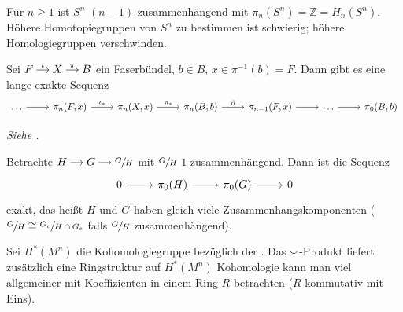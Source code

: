 \begin{bemerkung*}[{name=[Homologie und Homotopiegruppen der Sphäre]}]
	Für $n \ge 1$ ist $S^n$ $(n-1)$-zusammenhängend mit $\pi_n(S^n) = \mathbb{Z} = H_n(S^n)$.
	Höhere Homotopiegruppen von $S^n$ zu bestimmen ist schwierig; höhere Homologiegruppen verschwinden.
\end{bemerkung*}

\begin{satz}[{name={Homotopiesequenz}}]
	Sei \(
		\begin{tikzcd}[cramped,sep=small]
			F \rar["\iota"] & X \rar["\pi"] & B
		\end{tikzcd}
	\)
	ein Faserbündel, $b \in B$, $x \in \pi^{-1}(b)=F$.
	Dann gibt es eine lange exakte Sequenz
	\[
		\begin{tikzcd}
			\ldots  \rar & \pi_n(F,x) \rar["\iota_*"] & \pi_n(X,x) \rar["\pi_*"] & \pi_n(B,b) \rar["\partial"] & \pi_{n-1}(F,x) \rar & \ldots \rar & \pi_0(B,b)
		\end{tikzcd}
	\]
\end{satz}
\begin{beweis}
	\emph{Siehe \textcite[Thm.~4.41]{Hatcher}.}
\end{beweis}

\begin{beispiel*}[{name=[Zusammenhangskomponenten wenn Quotient einfach zusammenhängend]}]
	Betrachte \(
		\begin{tikzcd}[cramped,sep=small]
			H \rar & G \rar & \sfrac{G}{H}
		\end{tikzcd}
	\) mit $\sfrac{G}{H}$ $1$-zusammenhängend.
	Dann ist die Sequenz 
	\[
		\begin{tikzcd}
			0 \rar & \pi_0(H) \rar & \pi_0(G) \rar &  0
		\end{tikzcd}
	\]
	exakt, das heißt $H$ und $G$ haben gleich viele Zusammenhangskomponenten ($\sfrac{G}{H} \cong \sfrac{G_e}{H \cap G_e}$ falls $\sfrac{G}{H}$ zusammenhängend).
\end{beispiel*}

Sei $H^*(M^n)$ die Kohomologiegruppe bezüglich der .
Das $\smallsmile$-Produkt liefert zusätzlich eine Ringstruktur auf $H^*(M^n)$
Kohomologie kann man viel allgemeiner mit Koeffizienten in einem Ring $R$ betrachten ($R$ kommutativ mit Eins).

